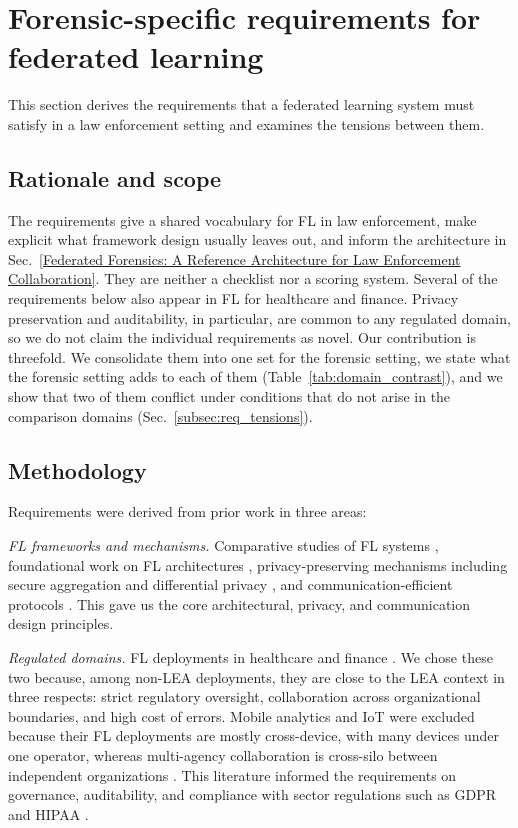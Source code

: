 \section{Forensic-specific requirements for federated learning}
\label{Forensic Specific Requirements for Federated Learning}

This section derives the requirements that a federated learning system must satisfy in a law enforcement setting and examines the tensions between them.


\subsection{Rationale and scope}

The requirements give a shared vocabulary for FL in law enforcement, make explicit what framework design usually leaves out, and inform the architecture in Sec.~\ref{Federated Forensics: A Reference Architecture for Law Enforcement Collaboration}. They are neither a checklist nor a scoring system.
%
Several of the requirements below also appear in FL for healthcare and finance. Privacy preservation and auditability, in particular, are common to any regulated domain, so we do not claim the individual requirements as novel. Our contribution is threefold. We consolidate them into one set for the forensic setting, we state what the forensic setting adds to each of them (Table~\ref{tab:domain_contrast}), and we show that two of them conflict under conditions that do not arise in the comparison domains (Sec.~\ref{subsec:req_tensions}).



\subsection{Methodology}
Requirements were derived from prior work in three areas:

\textit{FL frameworks and mechanisms.} Comparative studies of FL systems \citep{riedel2024comparative}, foundational work on FL architectures \citep{bonawitz2019towards, kairouz2021advances}, privacy-preserving mechanisms including secure aggregation \citep{secureAggration} and differential privacy \citep{mcmahan2018learning, geyer2017differentially}, and communication-efficient protocols \citep{mcmahan2017communication}. This gave us the core architectural, privacy, and communication design principles.

\textit{Regulated domains.} FL deployments in healthcare \citep{sheller2020federated, rieke2020future, xu2021federated} and finance \citep{FL_bank, yang2019federated}. We chose these two because, among non-LEA deployments, they are close to the LEA context in three respects: strict regulatory oversight, collaboration across organizational boundaries, and high cost of errors. Mobile analytics and IoT were excluded because their FL deployments are mostly cross-device, with many devices under one operator, whereas multi-agency collaboration is cross-silo between independent organizations \citep{kairouz2021advances}.
This literature informed the requirements on governance, auditability, and compliance with sector regulations such as GDPR \citep{voigt2017eu} and HIPAA \citep{annas2003hipaa}.

